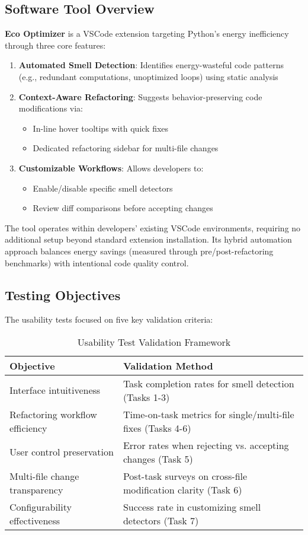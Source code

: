 \documentclass{article}
\begin{document}
\subsection{Software Tool Overview}
\textbf{Eco Optimizer} is a VSCode extension targeting Python's energy 
inefficiency through three core features:

\begin{enumerate}
    \item \textbf{Automated Smell Detection}: Identifies energy-wasteful 
    code patterns (e.g., redundant computations, unoptimized loops) using 
    static analysis
    \item \textbf{Context-Aware Refactoring}: Suggests behavior-preserving 
    code modifications via:
    \begin{itemize}
        \item In-line hover tooltips with quick fixes
        \item Dedicated refactoring sidebar for multi-file changes
    \end{itemize}
    \item \textbf{Customizable Workflows}: Allows developers to:
    \begin{itemize}
        \item Enable/disable specific smell detectors
        \item Review diff comparisons before accepting changes
    \end{itemize}
\end{enumerate}

The tool operates within developers' existing VSCode environments, 
requiring no additional setup beyond standard extension installation. 
Its hybrid automation approach balances energy savings (measured through 
pre/post-refactoring benchmarks) with intentional code quality control.

\subsection{Testing Objectives}
The usability tests focused on five key validation criteria:

\begin{table}[h]
\centering
\caption{Usability Test Validation Framework}
\label{tab:objectives}
\begin{tabular}{|p{}|p{}|}
\hline
\textbf{Objective} & \textbf{Validation Method} \\
\hline
Interface intuitiveness & Task completion rates for smell detection (Tasks 1-3) \\
\hline
Refactoring workflow efficiency & Time-on-task metrics for single/multi-file fixes (Tasks 4-6) \\
\hline
User control preservation & Error rates when rejecting vs. accepting changes (Task 5) \\
\hline
Multi-file change transparency & Post-task surveys on cross-file modification clarity (Task 6) \\
\hline
Configurability effectiveness & Success rate in customizing smell detectors (Task 7) \\
\hline
\end{tabular}
\end{table}
\end{document}
